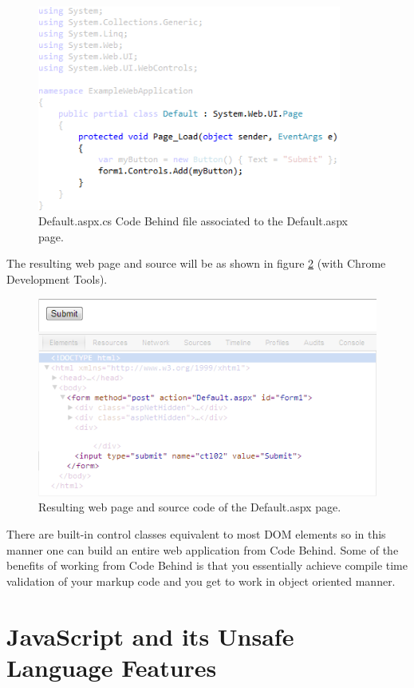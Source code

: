 				\begin{figure}
					\includegraphics[width=10cm]{resources/images/CodeBehind.png}
				\caption{Default.aspx.cs Code Behind file associated to the Default.aspx page.}
				\label{codeBehind}
			\end{figure}
		The resulting web page and source will be as shown in figure \ref{html} (with Chrome Development Tools).

				\begin{figure}
					\includegraphics[width=12cm]{resources/images/Html.png}
				\caption{Resulting web page and source code of the Default.aspx page.}
				\label{html}
			\end{figure}
		There are built-in control classes equivalent to most DOM elements so in this manner one can build an entire web application from Code Behind. Some of the benefits of working from Code Behind is that you essentially achieve compile time validation of your markup code and you get to work in object oriented manner.



\section{JavaScript and its Unsafe Language Features}

